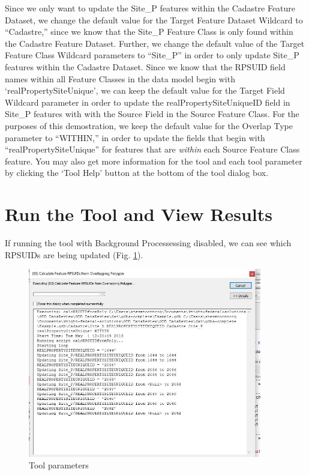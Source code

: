 \documentclass[openany]{book}
\theoremstyle{definition}
\theoremstyle{definition}
\theoremstyle{definition}
\theoremstyle{remark}
\begin{document}
Since we only want to update the Site\_P features within the Cadastre
Feature Dataset, we change the default value for the Target Feature
Dataset Wildcard to ``Cadastre,'' since we know that the Site\_P Feature
Class is only found within the Cadastre Feature Dataset. Further, we
change the default value of the Target Feature Class Wildcard parameters
to ``Site\_P'' in order to only update Site\_P features within the
Cadastre Dataset. Since we know that the RPSUID field names within all
Feature Classes in the data model begin with `realPropertySiteUnique',
we can keep the default value for the Target Field Wildcard parameter in
order to update the realPropertySiteUniqueID field in Site\_P features
with with the Source Field in the Source Feature Class. For the purposes
of this demostration, we keep the default value for the Overlap Type
parameter to ``WITHIN,'' in order to update the fields that begin with
``realPropertySiteUnique'' for features that are \emph{within} each
Source Feature Class feature. You may also get more information for the
tool and each tool parameter by clicking the `Tool Help' button at the
bottom of the tool dialog box.

\section{Run the Tool and View
Results}\label{run-the-tool-and-view-results-2}

If running the tool with Background Processessing disabled, we can see
which RPSUIDs are being updated (Fig. \ref{fig:sjcmessages}).

\begin{figure}[H]

{\centering \includegraphics[width=4.02in,]{figures/spatjoinCalc-toolmessages} 

}

\caption{Tool parameters}\label{fig:sjcmessages}
\end{figure}
\end{document}
